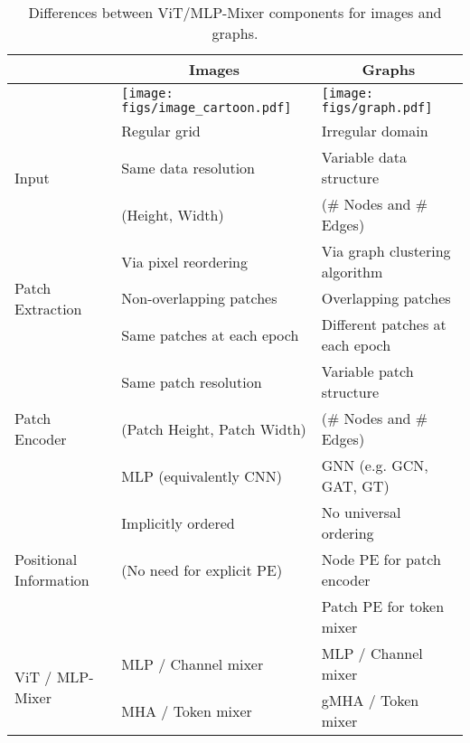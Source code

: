 \documentclass{article}
\begin{document}
\begin{table*}[t]
    \caption{Differences between ViT/MLP-Mixer components for images and graphs. }
    
    \centering    
    \begin{tabular}{lll}
    \toprule
           & \multicolumn{1}{c}{Images}   & \multicolumn{1}{c}{Graphs} \\
         \midrule
           & 
         \begin{minipage}{.3\textwidth}
\texttt{[image: figs/image\_cartoon.pdf]}
         \end{minipage} & 
         \begin{minipage}{.3\textwidth}
         \centering
         \texttt{[image: figs/graph.pdf]}
         \end{minipage} 
         \\
         \midrule
         \multirow{3}{*}{Input} 
         & Regular grid & Irregular domain \\
         & Same data resolution &  Variable data structure  \\
         & \quad (Height, Width) & \quad (\# Nodes and \# Edges) \\
         \midrule
        \multirow{3}{*}{Patch Extraction}  
        & Via pixel reordering  & {Via graph clustering algorithm} \\
        & Non-overlapping patches &  {Overlapping patches} \\
        & Same patches at each epoch  & {Different patches at each epoch} \\
        
        \midrule
        \multirow{3}{*}{Patch Encoder}
        & Same patch resolution  & Variable patch structure \\
        & \quad (Patch Height, Patch Width)  & \quad (\# Nodes and \# Edges) \\
        & MLP (equivalently CNN) & GNN (e.g. GCN, GAT, GT) \\
        
        \midrule
        \multirow{3}{*}{Positional Information }
        & Implicitly ordered & No universal ordering\\
        & \quad (No need for explicit PE) & {Node PE for patch encoder} \\
        & & {Patch PE for token mixer} \\
        
        \midrule
        \multirow{2}{*}{ViT / MLP-Mixer} 
        & MLP / Channel mixer
        & MLP / Channel mixer\\
         & MHA / Token mixer  & gMHA / Token mixer
        \\\bottomrule
    \end{tabular}
    \label{tab: comparision}
\end{table*}
\end{document}
